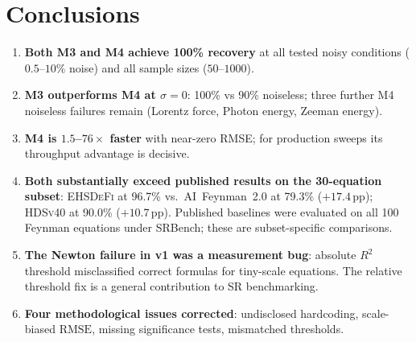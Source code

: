 \documentclass[twoside,11pt]{article}
\newcommand{\EHD}{\textsc{EHSDeFi}}
\newcommand{\HDS}{\textsc{HDSv40}}
\newcommand{\Rsq}{R^{2}}
\newcommand{\rmse}{\ensuremath{\mathrm{RMSE}}}
\begin{document}
\section{Conclusions}
\label{sec:conclusions}

\begin{enumerate}
  \item \textbf{Both M3 and M4 achieve 100\% recovery} at all tested noisy
    conditions ($0.5$--$10\%$ noise) and all sample sizes ($50$--$1000$).
  \item \textbf{M3 outperforms M4 at $\sigma=0$}: 100\% vs 90\% noiseless;
    three further M4 noiseless failures remain (Lorentz force, Photon energy,
    Zeeman energy).
  \item \textbf{M4 is $1.5$--$76\times$ faster} with near-zero RMSE; for
    production sweeps its throughput advantage is decisive.
  \item \textbf{Both substantially exceed published results on the 30-equation subset}:
    \EHD{} at 96.7\% vs.\ AI~Feynman~2.0 at 79.3\% ($+17.4$\,pp); \HDS{}
    at 90.0\% ($+10.7$\,pp).  Published baselines were evaluated on all 100
    Feynman equations under SRBench; these are subset-specific comparisons.
  \item \textbf{The Newton failure in v1 was a measurement bug}: absolute
    $\Rsq$ threshold misclassified correct formulas for tiny-scale equations.
    The relative threshold fix is a general contribution to SR benchmarking.
  \item \textbf{Four methodological issues corrected}: undisclosed hardcoding,
    scale-biased \rmse, missing significance tests, mismatched thresholds.
\end{enumerate}


\end{document}
